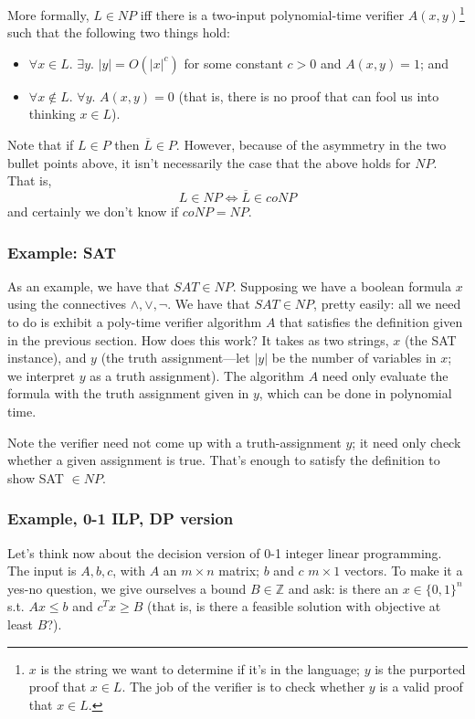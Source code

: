 \documentclass{article}
\begin{document}
More formally, $L\in NP$ iff there is a two-input polynomial-time verifier
$A(x,y)$\footnote{$x$ is the string we want to determine if it's in the 
language; $y$ is the purported proof that $x\in L$. The job of the verifier 
is to check whether $y$ is a valid proof that $x\in L$.} 
such that the following two things hold:
\begin{itemize}
\item
$\forall x\in L.\,\, \exists y.\,\, |y| = O(|x|^c)$ for some constant $c> 0$
and $A(x,y) = 1$; and

\item
$\forall x\not\in L.\,\, \forall y.\,\, A(x,y) = 0$ (that is, there is no
proof that can fool us into thinking $x\in L$).
\end{itemize}

Note that if $L\in P$ then $\overline L\in P$.
However, because of the asymmetry in the two bullet points above, it isn't
necessarily the case that the above holds for $NP$.
That is,
$$
L\in NP \Leftrightarrow \overline L \in coNP
$$
and certainly we don't know if $coNP = NP$.

\subsubsection{Example: SAT}

As an example, we have that $SAT \in NP$.
Supposing we have a boolean formula $x$ using the connectives 
$\wedge, \vee, \neg$.
We have that $SAT\in NP$, pretty easily: all we need to do is exhibit
a poly-time verifier algorithm $A$ that satisfies the definition given in the 
previous section.
How does this work? It takes as two strings, $x$ (the SAT instance), and
$y$ (the truth assignment---let $|y|$ be the number of variables in $x$;
we interpret $y$ as a truth assignment).
The algorithm $A$ need only evaluate the formula with the truth assignment
given in $y$, which can be done in polynomial time.

Note the verifier need not come up with a truth-assignment $y$; it need
only check whether a given assignment is true. That's enough to satisfy
the definition to show SAT $\in NP$.

\subsubsection{Example, 0-1 ILP, DP version}

Let's think now about the decision version of 0-1 integer linear programming.
The input is $A,b,c$, with $A$ an $m\times n$ matrix; 
$b$ and $c$ $m\times 1$ vectors.
To make it a yes-no question, we give ourselves a bound $B\in\mathbb Z$ and
ask: is there an $x\in \{0,1\}^n$ s.t.
$Ax\leq b$ and $c^Tx \geq B$ (that is, is there a feasible solution with
objective at least $B$?).
\end{document}
